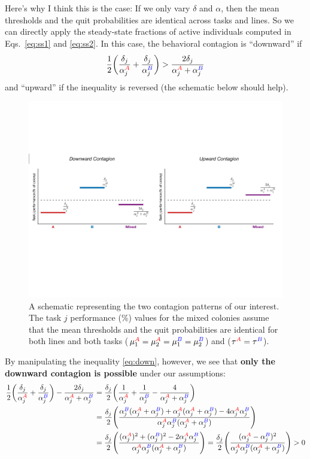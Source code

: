 \documentclass[10pt]{article}
\newcommand{\A}{{\color{red}A}}
\newcommand{\B}{{\color{blue}B}}
\begin{document}
Here's why I think this is the case: If we only vary $\delta$ and $\alpha$, then the mean thresholds and the quit probabilities are identical across tasks and lines. So we can directly apply the steady-state fractions of active individuals computed in Eqs.~\eqref{eq:ss1} and \eqref{eq:ss2}. In this case, the behavioral contagion is ``downward'' if
\begin{equation}
    \frac{1}{2} \bigg( \frac{\delta_j}{\alpha_j^{\A}} + \frac{\delta_j}{\alpha_j^{\B}} \bigg) > \frac{2\delta_j}{\alpha_j^{\A} + \alpha_j^{\B}} \label{eq:down}
\end{equation}
and ``upward'' if the inequality is reversed (the schematic below should help).
\begin{figure}[H]
    \centering
    \includegraphics[width=0.9\linewidth]{doc/schematic_contagion.pdf}
    \caption{A schematic representing the two contagion patterns of our interest. The task $j$ performance (\%) values for the mixed colonies assume that the mean thresholds and the quit probabilities are identical for both lines and both tasks ($\mu_1^{\A} = \mu_2^{\A} = \mu_1^{\B} = \mu_2^{\B}$) and ($\tau^{\A} = \tau^{\B}$).}
    \label{fig:schematic}
\end{figure}
By manipulating the inequality \eqref{eq:down}, however, we see that \textbf{only the downward contagion is possible} under our assumptions:
\begin{align}
    \frac{1}{2} \bigg( \frac{\delta_j}{\alpha_j^{\A}} + \frac{\delta_j}{\alpha_j^{\B}} \bigg) - \frac{2\delta_j}{\alpha_j^{\A} + \alpha_j^{\B}} 
    & = \frac{\delta_j}{2} \bigg( \frac{1}{\alpha_j^{\A}} + \frac{1}{\alpha_j^{\B}} - \frac{4}{\alpha_j^{\A} + \alpha_j^{\B}} \bigg) \nonumber\\
    & = \frac{\delta_j}{2} \Bigg( 
    \frac{\alpha_j^{\B} (\alpha_j^{\A} + \alpha_j^{\B}) + \alpha_j^{\A} (\alpha_j^{\A} + \alpha_j^{\B}) - 4\alpha_j^{\A}\alpha_j^{\B}}{\alpha_j^{\A}\alpha_j^{\B}(\alpha_j^{\A} + \alpha_j^{\B})} \Bigg) \nonumber\\
    & = \frac{\delta_j}{2} \Bigg( 
    \frac{ (\alpha_j^{\A})^2 + (\alpha_j^{\B})^2 - 2\alpha_j^{\A}\alpha_j^{\B}}{\alpha_j^{\A}\alpha_j^{\B}(\alpha_j^{\A} + \alpha_j^{\B})} \Bigg) 
    = \frac{\delta_j}{2} \Bigg( 
    \frac{ (\alpha_j^{\A} - \alpha_j^{\B})^2 }{\alpha_j^{\A}\alpha_j^{\B}(\alpha_j^{\A} + \alpha_j^{\B})} \Bigg) > 0
\end{align}
\end{document}
